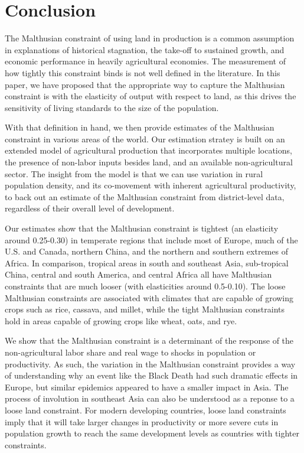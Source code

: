 \documentclass[11pt]{article}
\begin{document}
\section{Conclusion}
The Malthusian constraint of using land in production is a common assumption in explanations of historical stagnation, the take-off to sustained growth, and economic performance in heavily agricultural economies. The measurement of how tightly this constraint binds is not well defined in the literature. In this paper, we have proposed that the appropriate way to capture the Malthusian constraint is with the elasticity of output with respect to land, as this drives the sensitivity of living standards to the size of the population.

With that definition in hand, we then provide estimates of the Malthusian constraint in various areas of the world. Our estimation stratey is built on an extended model of agricultural production that incorporates multiple locations, the presence of non-labor inputs besides land, and an available non-agricultural sector. The insight from the model is that we can use variation in rural population density, and its co-movement with inherent agricultural productivity, to back out an estimate of the Malthusian constraint from district-level data, regardless of their overall level of development.

Our estimates show that the Malthusian constraint is tightest (an elasticity around 0.25-0.30) in temperate regions that include most of Europe, much of the U.S. and Canada, northern China, and the northern and southern extremes of Africa. In comparison, tropical areas in south and southeast Asia, sub-tropical China, central and south America, and central Africa all have Malthusian constraints that are much looser (with elasticities around 0.5-0.10). The loose Malthusian constraints are associated with climates that are capable of growing crops such as rice, cassava, and millet, while the tight Malthusian constraints hold in areas capable of growing crops like wheat, oats, and rye.

We show that the Malthusian constraint is a determinant of the response of the non-agricultural labor share and real wage to shocks in population or productivity. As such, the variation in the Malthusian constraint provides a way of understanding why an event like the Black Death had such dramatic effects in Europe, but similar epidemics appeared to have a smaller impact in Asia. The process of involution in southeast Asia can also be understood as a reponse to a loose land constraint. For modern developing countries, loose land constraints imply that it will take larger changes in productivity or more severe cuts in population growth to reach the same development levels as countries with tighter constraints.
\end{document}
